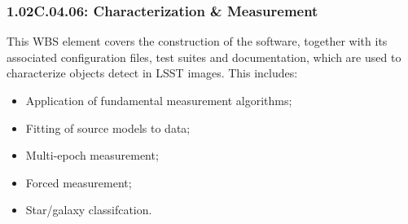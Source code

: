 \subsubsection{1.02C.04.06: Characterization \& Measurement}

This WBS element covers the construction of the software, together with
its associated configuration files, test suites and documentation, which
are used to characterize objects detect in LSST images. This includes:

\begin{itemize}
\item{Application of fundamental measurement algorithms;}
\item{Fitting of source models to data;}
\item{Multi-epoch measurement;}
\item{Forced measurement;}
\item{Star/galaxy classifcation.}
\end{itemize}
